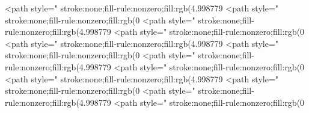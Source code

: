 <path style=" stroke:none;fill-rule:nonzero;fill:rgb(4.998779%
<path style=" stroke:none;fill-rule:nonzero;fill:rgb(0%
<path style=" stroke:none;fill-rule:nonzero;fill:rgb(4.998779%
<path style=" stroke:none;fill-rule:nonzero;fill:rgb(0%
<path style=" stroke:none;fill-rule:nonzero;fill:rgb(4.998779%
<path style=" stroke:none;fill-rule:nonzero;fill:rgb(0%
<path style=" stroke:none;fill-rule:nonzero;fill:rgb(4.998779%
<path style=" stroke:none;fill-rule:nonzero;fill:rgb(0%
<path style=" stroke:none;fill-rule:nonzero;fill:rgb(4.998779%
<path style=" stroke:none;fill-rule:nonzero;fill:rgb(0%
<path style=" stroke:none;fill-rule:nonzero;fill:rgb(4.998779%
<path style=" stroke:none;fill-rule:nonzero;fill:rgb(0%

